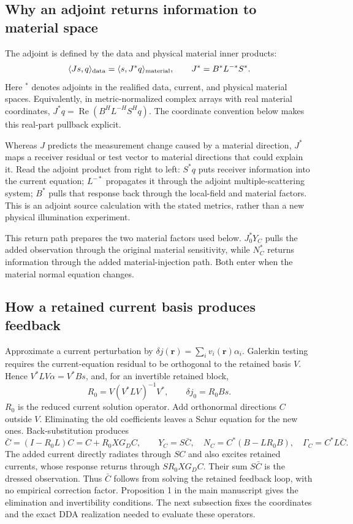 \subsection*{Why an adjoint returns information to material space}
The adjoint is defined by the data and physical material inner products:
\[
\langle Js,q\rangle_{\rm data}=\langle s,J^*q\rangle_{\rm material},
\qquad J^*=B^*L^{-*}S^*.
\]
Here $^*$ denotes adjoints in the realified data, current, and physical material spaces. Equivalently, in metric-normalized complex arrays with real material coordinates, $J^*q=\operatorname{Re}(B^HL^{-H}S^Hq)$. The coordinate convention below makes this real-part pullback explicit.

Whereas $J$ predicts the measurement change caused by a material direction, $J^*$ maps a receiver residual or test vector to material directions that could explain it. Read the adjoint product from right to left: $S^*q$ puts receiver information into the current equation; $L^{-*}$ propagates it through the adjoint multiple-scattering system; $B^*$ pulls that response back through the local-field and material factors. This is an adjoint source calculation with the stated metrics, rather than a new physical illumination experiment.

This return path prepares the two material factors used below. $J_0^*Y_C$ pulls the added observation through the original material sensitivity, while $N_C^*$ returns information through the added material-injection path. Both enter when the material normal equation changes.

\subsection*{How a retained current basis produces feedback}
Approximate a current perturbation by $\delta j(\boldsymbol r)=\sum_i v_i(\boldsymbol r)\alpha_i$. Galerkin testing requires the current-equation residual to be orthogonal to the retained basis $V$. Hence $V^*LV\alpha=V^*Bs$, and, for an invertible retained block,
\[
R_0=V(V^*LV)^{-1}V^*,\qquad \delta j_0=R_0Bs.
\]
$R_0$ is the reduced current solution operator. Add orthonormal directions $C$ outside $V$. Eliminating the old coefficients leaves a Schur equation for the new ones. Back-substitution produces
\[
\bar C=(I-R_0L)C=C+R_0XG_DC,\qquad
Y_C=S\bar C,\quad N_C=C^*(B-LR_0B),\quad\Gamma_C=C^*L\bar C.
\]
The added current directly radiates through $SC$ and also excites retained currents, whose response returns through $SR_0XG_DC$. Their sum $S\bar C$ is the dressed observation. Thus $\bar C$ follows from solving the retained feedback loop, with no empirical correction factor. Proposition 1 in the main manuscript gives the elimination and invertibility conditions. The next subsection fixes the coordinates and the exact DDA realization needed to evaluate these operators.
